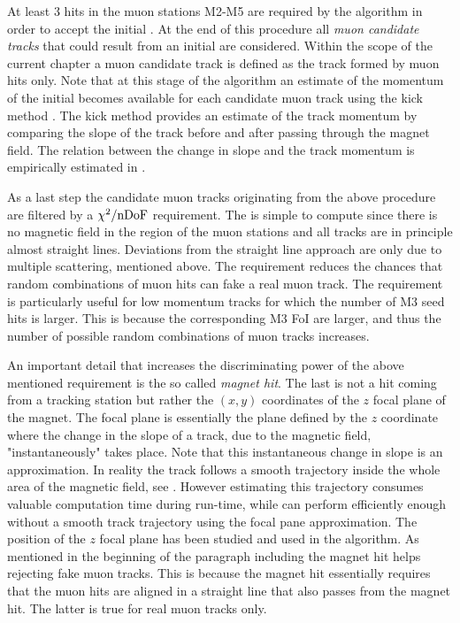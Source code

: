 At least 3 hits in the muon stations M2-M5 are required by the \mvm algorithm in order to accept the initial \veloTrack.
At the end of this procedure all {\it muon candidate tracks} that could result from an initial \veloTrack are considered.
Within the scope of the current chapter a muon candidate track is defined as the track formed by muon hits only.
Note that at this stage of the algorithm an estimate of the momentum of the initial \veloTrack becomes available
for each candidate muon track using the kick method \cite{Hommels:999327}. The kick method provides an estimate
of the track momentum by comparing the slope of the track before and after passing through the \lhcb magnet
field. The relation between the change in slope and the track momentum is empirically estimated in \cite{roelThesis}.

As a last step the candidate muon tracks originating from the above procedure are filtered by a $\chi^2/{\rm nDoF}$
requirement. The \chisq is simple to compute since there is no magnetic field in the region of the muon stations
and all tracks are in principle almost straight lines. Deviations from the straight line approach are only due to
multiple scattering, mentioned above. The \chisq requirement reduces the chances that random combinations of muon hits
can fake a real muon track. The requirement is particularly useful for low momentum tracks for which the number
of M3 seed hits is larger. This is because the corresponding M3 FoI are larger, and thus the number of possible
random combinations of muon tracks increases.

An important detail that increases the discriminating power of the above mentioned \chisq requirement is the
so called {\it magnet hit}. The last is not a hit coming from a tracking station but rather the $(x,y)$ coordinates
of the $z$ focal plane of the \lhcb magnet. The focal plane is essentially the plane defined by the $z$ coordinate
where the change in the slope of a track, due to the magnetic field,  "instantaneously" takes place. Note that this
instantaneous change in slope is an approximation. In reality the track follows a smooth trajectory inside the whole
area of the magnetic field, see . However estimating this trajectory consumes valuable computation
time during \hltone run-time, while \mvm can perform efficiently enough without a smooth track trajectory using the focal
pane approximation. The position of the $z$ focal plane has been studied \cite{Hommels:999327} and used in the \mvm algorithm.
As mentioned in the beginning of the paragraph including the magnet hit helps rejecting fake muon tracks.
This is because the magnet hit essentially requires that the muon hits are aligned in a straight line that
also passes from the magnet hit. The latter is true for real muon tracks only.

